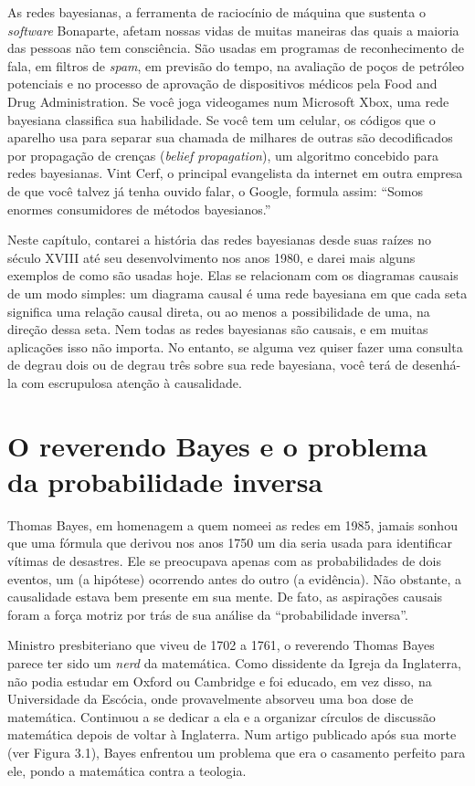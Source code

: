 \documentclass[11pt,a5paper,twoside]{book}
\begin{document}
As redes bayesianas, a ferramenta de raciocínio de máquina que sustenta o \textit{software} Bonaparte, afetam nossas vidas de muitas maneiras das quais a maioria das pessoas não tem consciência. São usadas em programas de reconhecimento de fala, em filtros de \textit{spam}, em previsão do tempo, na avaliação de poços de petróleo potenciais e no processo de aprovação de dispositivos médicos pela Food and Drug Administration. Se você joga videogames num Microsoft Xbox, uma rede bayesiana classifica sua habilidade. Se você tem um celular, os códigos que o aparelho usa para separar sua chamada de milhares de outras são decodificados por propagação de crenças (\textit{belief propagation}), um algoritmo concebido para redes bayesianas. Vint Cerf, o principal evangelista da internet em outra empresa de que você talvez já tenha ouvido falar, o Google, formula assim: “Somos enormes consumidores de métodos bayesianos.”

Neste capítulo, contarei a história das redes bayesianas desde suas raízes no século XVIII até seu desenvolvimento nos anos 1980, e darei mais alguns exemplos de como são usadas hoje. Elas se relacionam com os diagramas causais de um modo simples: um diagrama causal é uma rede bayesiana em que cada seta significa uma relação causal direta, ou ao menos a possibilidade de uma, na direção dessa seta. Nem todas as redes bayesianas são causais, e em muitas aplicações isso não importa. No entanto, se alguma vez quiser fazer uma consulta de degrau dois ou de degrau três sobre sua rede bayesiana, você terá de desenhá-la com escrupulosa atenção à causalidade.

\section{O reverendo Bayes e o problema da probabilidade inversa}
Thomas Bayes, em homenagem a quem nomeei as redes em 1985, jamais sonhou que uma fórmula que derivou nos anos 1750 um dia seria usada para identificar vítimas de desastres. Ele se preocupava apenas com as probabilidades de dois eventos, um (a hipótese) ocorrendo antes do outro (a evidência). Não obstante, a causalidade estava bem presente em sua mente. De fato, as aspirações causais foram a força motriz por trás de sua análise da “probabilidade inversa”.

Ministro presbiteriano que viveu de 1702 a 1761, o reverendo Thomas Bayes parece ter sido um \textit{nerd} da matemática. Como dissidente da Igreja da Inglaterra, não podia estudar em Oxford ou Cambridge e foi educado, em vez disso, na Universidade da Escócia, onde provavelmente absorveu uma boa dose de matemática. Continuou a se dedicar a ela e a organizar círculos de discussão matemática depois de voltar à Inglaterra. Num artigo publicado após sua morte (ver Figura 3.1), Bayes enfrentou um problema que era o casamento perfeito para ele, pondo a matemática contra a teologia.
\end{document}
